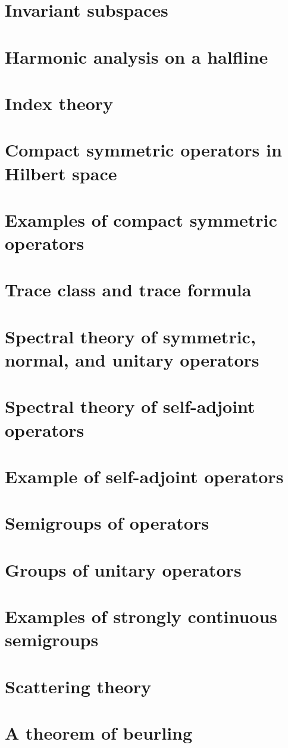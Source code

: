 \documentclass[11pt]{elegantbook}
\begin{document}
\chapter{Invariant subspaces}

\chapter{Harmonic analysis on a halfline}

\chapter{Index theory}

\chapter{Compact symmetric operators in Hilbert space}

\chapter{Examples of compact symmetric operators}

\chapter{Trace class and trace formula}

\chapter{Spectral theory of symmetric, normal, and unitary operators}

\chapter{Spectral theory of self-adjoint operators}

\chapter{Example of self-adjoint operators}

\chapter{Semigroups of operators}

\chapter{Groups of unitary operators}

\chapter{Examples of strongly continuous semigroups}

\chapter{Scattering theory}

\chapter{A theorem of beurling}
\end{document}
